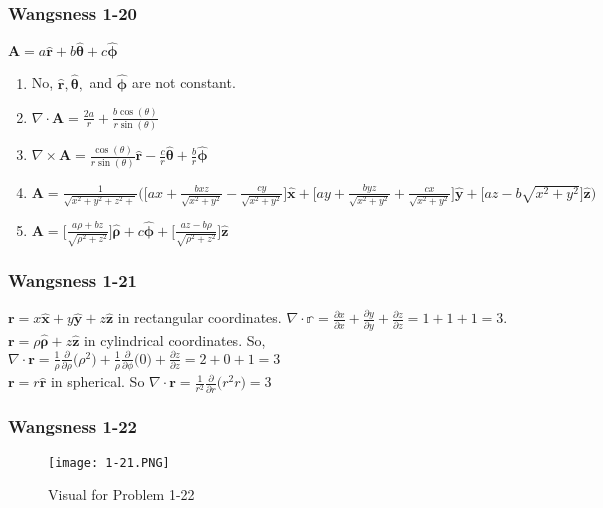 \documentclass[oneside]{book}
\theoremstyle{definition}
\newcommand*\B[1]{\mathbf{#1}}
\newcommand*\Bh[1]{\mathbf{\hat{#1}}}
\begin{document}
\subsubsection{Wangsness 1-20}
$\B{A} = a\Bh{r}+b\Bh{\theta}+c\Bh{\phi}$
\begin{enumerate}
\item No, $\Bh{r},\Bh{\theta},$ and $\Bh{\phi}$ are not constant.
\item $\nabla \cdot \B{A} = \frac{2a}{r}+\frac{b\cos(\theta)}{r\sin(\theta)}$
\item $\nabla \times \B{A} = \frac{\cos(\theta)}{r\sin(\theta)}\Bh{r}-\frac{c}{r}\Bh{\theta}+\frac{b}{r}\Bh{\phi}$
\item $\B{A} = \frac{1}{\sqrt{x^2+y^2+z^2+}}\bigg(\big[ax+\frac{bxz}{\sqrt{x^2+y^2}}-\frac{cy}{\sqrt{x^2+y^2}}\big]\Bh{x}+\big[ay+\frac{byz}{\sqrt{x^2+y^2}}+\frac{cx}{\sqrt{x^2+y^2}}\big]\Bh{y}+\big[az-b\sqrt{x^2+y^2}\big]\Bh{z}\bigg)$
\item $\B{A} = \big[\frac{a\rho+bz}{\sqrt{\rho^2+z^2}}\big]\Bh{\rho}+c\Bh{\phi}+\big[\frac{az-b\rho}{\sqrt{\rho^2+z^2}}\big]\Bh{z}$
\end{enumerate}

\subsubsection{Wangsness 1-21}
$\B{r} = x\Bh{x}+y\Bh{y}+z\Bh{z}$ in rectangular coordinates. $\nabla \cdot \mathbb{r} = \frac{\partial x}{\partial x} + \frac{\partial y}{\partial y} +\frac{\partial z}{\partial z} = 1+1+1 = 3$.\\
$\B{r} = \rho\Bh{\rho}+z\Bh{z}$ in cylindrical coordinates. So, $\nabla \cdot \B{r} = \frac{1}{\rho}\frac{\partial}{\partial \rho}\big(\rho^2\big) + \frac{1}{\rho} \frac{\partial}{\partial \phi}\big(0\big) + \frac{\partial z}{\partial z} = 2+0+1 = 3$\\
$\B{r} = r\Bh{r}$ in spherical. So $\nabla \cdot \B{r} = \frac{1}{r^2}\frac{\partial}{\partial r}\big(r^2 r\big) = 3$

\subsubsection{Wangsness 1-22}

\begin{figure}[htbp]
\begin{center}
\texttt{[image: 1-21.PNG]}
\caption{Visual for Problem 1-22}
\label{default}
\end{center}
\end{figure}
\end{document}
